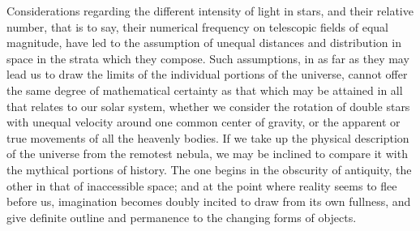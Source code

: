 Considerations regarding the different intensity of light in stars, and their relative number, that is to say, their numerical frequency on telescopic fields of equal magnitude, have led to the assumption of unequal distances and distribution in space in the strata which they compose. Such assumptions, in as far as they may lead us to draw the limits of the individual portions of the universe, cannot offer the same degree of mathematical certainty as that which may be attained in all that relates to our solar system, whether we consider the rotation of double stars with unequal velocity around one common center of gravity, or the apparent or true movements of all the heavenly bodies. If we take up the physical description of the universe from the remotest nebula, we may be inclined to compare it with the mythical portions of history. The one begins in the obscurity of antiquity, the other in that of inaccessible space; and at the point where reality seems to flee before us, imagination becomes doubly incited to draw from its own fullness, and give definite outline and permanence to the changing forms of objects.

